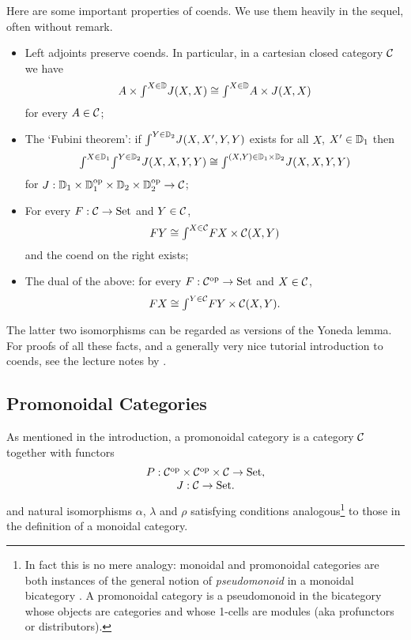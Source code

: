 \documentclass{robincs}
\let\origint = \int
\def\int{{\textstyle\origint}}
\newlength{\tw}\setlength{\tw}{\textwidth}\addtolength{\tw}{-\arrayrulewidth}
\begin{document}
Here are some important properties of coends.
We use them heavily in the sequel, often without remark.
\begin{itemize}
        \item Left adjoints preserve coends. In particular, in a cartesian
                closed category $\mathcal{C}$ we have
                \[
                        A\times\int^{X\in\D} J(X,X) \cong \int^{X\in\D} A\times J(X,X)
                \]
                for every $A\in\mathcal{C}$;
        \item The `Fubini theorem': if $\int^{Y\in\D_2}J(X,X',Y,Y)$ exists for
                        all $X$, $X'\in\mathbb{D}_1$ then
        \[
                \int^{X\in\D_1}\int^{Y\in\D_2} J(X,X,Y,Y) \cong
                        \int^{(X,Y)\in\D_1\times\D_2}J(X,X,Y,Y)
        \]
        for $J: \mathbb{D}_1\times\mathbb{D}_1^\mathrm{op}\times\mathbb{D}_2\times\mathbb{D}_2^\mathrm{op}\to\mathcal{C}$;
        \item For every $F:\mathcal{C}\to\mathrm{Set}$ and $Y\in\mathcal{C}$,
        \[
                FY \cong \int^{X\in\C} FX\times\C(X,Y)
        \]
        and the coend on the right exists;
        \item The dual of the above: for every $F: \mathcal{C}^\mathrm{op}\to\mathrm{Set}$ and $X\in\mathcal{C}$,
        \[
                FX \cong \int^{Y\in\C} FY\times\C(X,Y).
        \]
\end{itemize}
The latter two isomorphisms can be regarded as versions of the
Yoneda lemma. For proofs of all these facts, and a generally very
nice tutorial introduction to coends, see the lecture notes by
\citet{CatNotes}.
%

\subsection{Promonoidal Categories}\label{s-promon}
As mentioned in the introduction, a promonoidal category is a
category $\mathcal{C}$ together with functors
\[\begin{array}{c}
        P: \mathcal{C}^\mathrm{op}\times\mathcal{C}^\mathrm{op}\times\mathcal{C}\to\mathrm{Set},\\
        J: \mathcal{C} \to \mathrm{Set}.
\end{array}\]
and natural isomorphisms $\alpha$, $\lambda$ and $\rho$
satisfying conditions analogous\footnote{
        In fact this is no mere analogy: monoidal and promonoidal
        categories are both instances of the general notion of
        \emph{pseudomonoid} in a monoidal bicategory \citep{MonBicat}.
        A promonoidal category is a pseudomonoid in the bicategory
        whose objects are categories and whose 1-cells are modules
        (aka profunctors or distributors).
} to those in the definition of a monoidal category.
\end{document}
